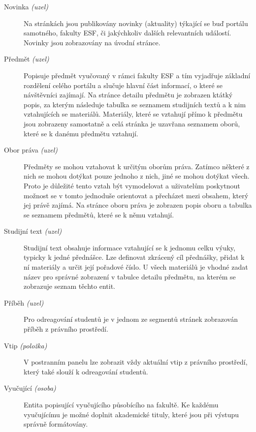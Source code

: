 \begin{description}
  \item[Novinka \emph{(uzel)}] Na stránkách jsou publikovány novinky (aktuality) týkající se buď portálu samotného, fakulty ESF, či jakýchkoliv dalších relevantních událostí. Novinky jsou zobrazovány na úvodní stránce. 
  
  \item[Předmět \emph{(uzel)}] Popisuje předmět vyučovaný v rámci fakulty ESF a tím vyjadřuje základní rozdělení celého portálu a slučuje hlavní část informací, o které se návštěvníci zajímají. Na stránce detailu předmětu je zobrazen ktátký popis, za kterým následuje tabulka se seznamem studijních textů a k nim vztahujících se materiálů. Materiály, které se vztahují přímo k předmětu jsou zobrazeny samostatně a celá stránka je uzavřana seznamem oborů, které se k danému předmětu vztahují.

  \item[Obor práva \emph{(uzel)}] Předměty se mohou vztahovat k určitým oborům práva. Zatímco některé z nich se mohou dotýkat pouze jednoho z nich, jiné se mohou dotýkat všech. Proto je důležité tento vztah být vymodelovat a uživatelům poskytnout možnost se v tomto jednoduše orientovat a přecházet mezi obsahem, který jej právě zajímá. Na stránce oboru práva je zobrazen popis oboru a tabulka se seznamem předmětů, které se k němu vztahují.

  \item[Studijní text \emph{(uzel)}] Studijní text obsahuje informace vztahující se k jednomu celku výuky, typicky k jedné přednášce. Lze definovat zkrácený cíl přednášky, přidat k ní materiály a určit její pořadové číslo. U všech materiálů je vhodné zadat název pro správné zobrazení v tabulce detailu předmětu, na kterém se zobrazuje seznam těchto entit.

  \item[Příběh \emph{(uzel)}] Pro odreagování studentů je v jednom ze segmentů stránek zobrazován příběh z právního prostředí. 

  \item[Vtip \emph{(položka)}] V postranním panelu lze zobrazit vždy aktuální vtip z právního prostředí, který také slouží k odreagování studentů. 

  \item[Vyučující \emph{(osoba)}] Entita popisující vyučujícího působícího na fakultě. Ke každému vyučujícímu je možné doplnit akademické tituly, které jsou při výstupu správně formátovány.
\end{description}

